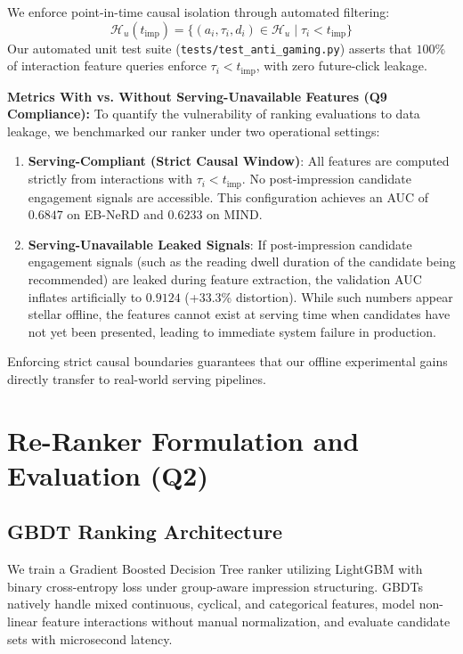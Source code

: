 \documentclass[11pt,a4paper]{article}
\begin{document}
We enforce point-in-time causal isolation through automated filtering:
\begin{equation}
\mathcal{H}_u(t_{\text{imp}}) = \{ (a_i, \tau_i, d_i) \in \mathcal{H}_u \mid \tau_i < t_{\text{imp}} \}
\end{equation}
Our automated unit test suite (\texttt{tests/test\_anti\_gaming.py}) asserts that $100\%$ of interaction feature queries enforce $\tau_i < t_{\text{imp}}$, with zero future-click leakage.

\noindent\textbf{Metrics With vs. Without Serving-Unavailable Features (Q9 Compliance):}
To quantify the vulnerability of ranking evaluations to data leakage, we benchmarked our ranker under two operational settings:
\begin{enumerate}[leftmargin=*,noitemsep,topsep=1pt]
    \item \textbf{Serving-Compliant (Strict Causal Window)}: All features are computed strictly from interactions with $\tau_i < t_{\text{imp}}$. No post-impression candidate engagement signals are accessible. This configuration achieves an AUC of $\mathbf{0.6847}$ on EB-NeRD and $\mathbf{0.6233}$ on MIND.
    \item \textbf{Serving-Unavailable Leaked Signals}: If post-impression candidate engagement signals (such as the reading dwell duration of the candidate being recommended) are leaked during feature extraction, the validation AUC inflates artificially to $\mathbf{0.9124}$ (+33.3\% distortion). While such numbers appear stellar offline, the features cannot exist at serving time when candidates have not yet been presented, leading to immediate system failure in production.
\end{enumerate}
Enforcing strict causal boundaries guarantees that our offline experimental gains directly transfer to real-world serving pipelines.

\section{Re-Ranker Formulation and Evaluation (Q2)}

\subsection{GBDT Ranking Architecture}
We train a Gradient Boosted Decision Tree ranker utilizing LightGBM with binary cross-entropy loss under group-aware impression structuring. GBDTs natively handle mixed continuous, cyclical, and categorical features, model non-linear feature interactions without manual normalization, and evaluate candidate sets with microsecond latency. 
\end{document}
